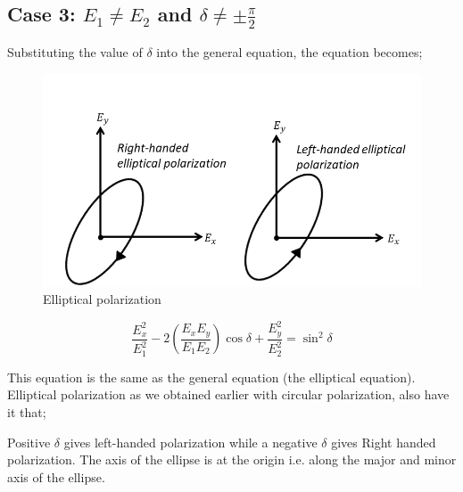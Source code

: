 \subsection{Case 3: \texorpdfstring{$E_1\neq E_2$}{E1≠E2} and \texorpdfstring{$\delta\neq\pm\frac{\pi}{2}$}{δ≠𝜆/2}}
Substituting the value of $\delta$ into the general equation, the equation becomes;
\begin{figure}[h]
\centering
\includegraphics[width=1\linewidth]{./graphics/elliptical_polarization}
\caption{Elliptical polarization}
\end{figure}

\begin{equation}
\frac{E_{x}^2}{E_{1}^2} -2(\frac{E_{x}E_{y}}{E_{1}E_{2}})\cos\delta + \frac{E_{y}^2}{E_{2}^2} =\sin^2 \delta
\end{equation}

This equation is the same as the general equation (the elliptical equation). Elliptical polarization as we obtained earlier with circular polarization, also have it that;

Positive $\delta$ gives left-handed polarization while a negative $\delta$ gives Right handed polarization. The axis of the ellipse is at the origin i.e. along the major and minor axis of the ellipse.

